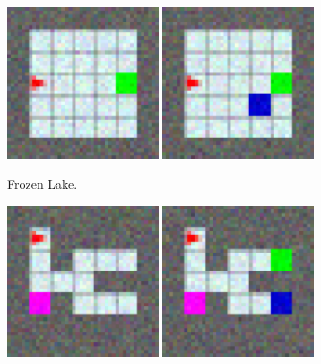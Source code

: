 \begin{figure}[t!]
    \centering
    \begin{subfigure}[t]{0.23\textwidth}  
        \includegraphics[width=0.49\textwidth]{figures/sec4/MiniGrid-LavaGapS7-v0_observe.pdf}  
        \includegraphics[width=0.49\textwidth]{figures/sec4/MiniGrid-LavaGapS7-v0_full_observe.pdf} 
        \caption{Frozen Lake.}
        \label{fig:gridworld_asym:IceLake:im}
    \end{subfigure}\hfill%
    \begin{subfigure}[t]{0.23\textwidth}  
        \includegraphics[width=0.49\textwidth]{figures/sec4/MiniGrid-TigerDoorEnv-v0_observe.pdf}
        \includegraphics[width=0.49\textwidth]{figures/sec4/MiniGrid-TigerDoorEnv-v0_full_observe.pdf} 

\end{subfigure}
\end{figure}
